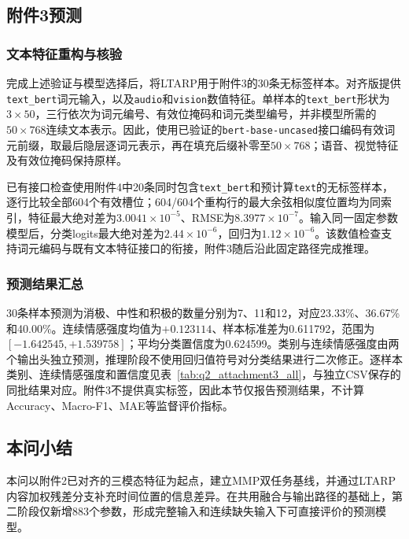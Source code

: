 \documentclass[UTF8,a4paper,11pt]{ctexart}
\newcommand{\QTwoParagraph}{\par\noindent\hspace*{2em}}
\newcounter{q2algorithm}
\begin{document}
\subsection{附件3预测}\label{subsec:q2_attachment3}
\subsubsection{文本特征重构与核验}
\QTwoParagraph 完成上述验证与模型选择后，将LTARP用于附件3的30条无标签样本。对齐版提供\texttt{text\_bert}词元输入，以及\texttt{audio}和\texttt{vision}数值特征。单样本的\texttt{text\_bert}形状为$3\times50$，三行依次为词元编号、有效位掩码和词元类型编号，并非模型所需的$50\times768$连续文本表示。因此，使用已验证的\texttt{bert-base-uncased}接口编码有效词元前缀，取最后隐层逐词元表示，再在填充后缀补零至$50\times768$；语音、视觉特征及有效位掩码保持原样。

\QTwoParagraph 已有接口检查使用附件4中20条同时包含\texttt{text\_bert}和预计算\texttt{text}的无标签样本，逐行比较全部604个有效槽位；604/604个重构行的最大余弦相似度位置均为同索引，特征最大绝对差为$3.0041\times10^{-5}$、RMSE为$8.3977\times10^{-7}$。输入同一固定参数模型后，分类logits最大绝对差为$2.44\times10^{-6}$，回归为$1.12\times10^{-6}$。该数值检查支持词元编码与既有文本特征接口的衔接，附件3随后沿此固定路径完成推理。

\subsubsection{预测结果汇总}
\QTwoParagraph 30条样本预测为消极、中性和积极的数量分别为7、11和12，对应23.33\%、36.67\%和40.00\%。连续情感强度均值为$+0.123114$、样本标准差为0.611792，范围为$[-1.642545,+1.539758]$；平均分类置信度为0.624599。类别与连续情感强度由两个输出头独立预测，推理阶段不使用回归值符号对分类结果进行二次修正。逐样本类别、连续情感强度和置信度见表~\ref{tab:q2_attachment3_all}，与独立CSV保存的同批结果对应。附件3不提供真实标签，因此本节仅报告预测结果，不计算Accuracy、Macro-F1、MAE等监督评价指标。


\FloatBarrier

\subsection{本问小结}\label{subsec:q2_summary}
\QTwoParagraph 本问以附件2已对齐的三模态特征为起点，建立MMP双任务基线，并通过LTARP内容加权残差分支补充时间位置的信息差异。在共用融合与输出路径的基础上，第二阶段仅新增883个参数，形成完整输入和连续缺失输入下可直接评价的预测模型。
\end{document}
